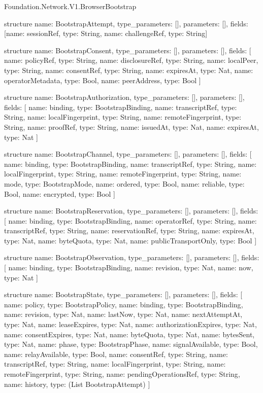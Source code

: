 \begin{lexlean}{Foundation.Network.V1.BrowserBootstrap}
\begin{semanticmodule}
structure{
  name: BootstrapAttempt,
  type_parameters: [],
  parameters: [],
  fields: [{name: sessionRef, type: String}, {name: challengeRef, type: String}]
}

structure{
  name: BootstrapConsent,
  type_parameters: [],
  parameters: [],
  fields: [
    {name: policyRef, type: String},
    {name: disclosureRef, type: String},
    {name: localPeer, type: String},
    {name: consentRef, type: String},
    {name: expiresAt, type: Nat},
    {name: operatorMetadata, type: Bool},
    {name: peerAddress, type: Bool}
  ]
}

structure{
  name: BootstrapAuthorization,
  type_parameters: [],
  parameters: [],
  fields: [
    {name: binding, type: BootstrapBinding},
    {name: transcriptRef, type: String},
    {name: localFingerprint, type: String},
    {name: remoteFingerprint, type: String},
    {name: proofRef, type: String},
    {name: issuedAt, type: Nat},
    {name: expiresAt, type: Nat}
  ]
}

structure{
  name: BootstrapChannel,
  type_parameters: [],
  parameters: [],
  fields: [
    {name: binding, type: BootstrapBinding},
    {name: transcriptRef, type: String},
    {name: localFingerprint, type: String},
    {name: remoteFingerprint, type: String},
    {name: mode, type: BootstrapMode},
    {name: ordered, type: Bool},
    {name: reliable, type: Bool},
    {name: encrypted, type: Bool}
  ]
}

structure{
  name: BootstrapReservation,
  type_parameters: [],
  parameters: [],
  fields: [
    {name: binding, type: BootstrapBinding},
    {name: operatorRef, type: String},
    {name: transcriptRef, type: String},
    {name: reservationRef, type: String},
    {name: expiresAt, type: Nat},
    {name: byteQuota, type: Nat},
    {name: publicTransportOnly, type: Bool}
  ]
}

structure{
  name: BootstrapObservation,
  type_parameters: [],
  parameters: [],
  fields: [
    {name: binding, type: BootstrapBinding},
    {name: revision, type: Nat},
    {name: now, type: Nat}
  ]
}

structure{
  name: BootstrapState,
  type_parameters: [],
  parameters: [],
  fields: [
    {name: policy, type: BootstrapPolicy},
    {name: binding, type: BootstrapBinding},
    {name: revision, type: Nat},
    {name: lastNow, type: Nat},
    {name: nextAttemptAt, type: Nat},
    {name: leaseExpires, type: Nat},
    {name: authorizationExpires, type: Nat},
    {name: consentExpires, type: Nat},
    {name: byteQuota, type: Nat},
    {name: bytesSent, type: Nat},
    {name: phase, type: BootstrapPhase},
    {name: signalAvailable, type: Bool},
    {name: relayAvailable, type: Bool},
    {name: consentRef, type: String},
    {name: transcriptRef, type: String},
    {name: localFingerprint, type: String},
    {name: remoteFingerprint, type: String},
    {name: pendingOperationsRef, type: String},
    {name: history, type: (List BootstrapAttempt)}
  ]
}


\end{semanticmodule}
\end{lexlean}
